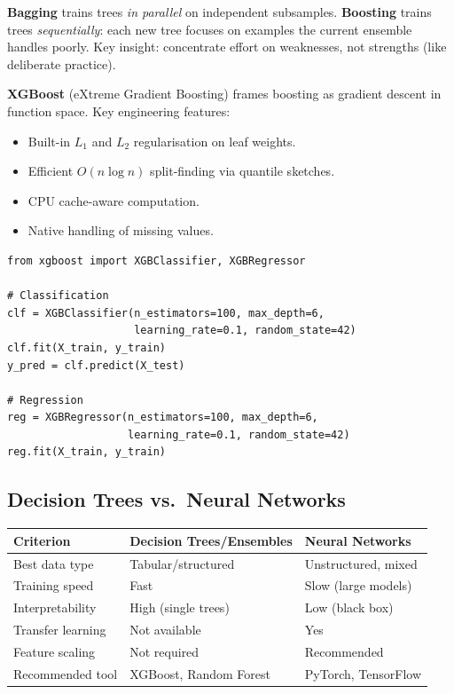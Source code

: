 \textbf{Bagging} trains trees \emph{in parallel} on independent subsamples.
\textbf{Boosting} trains trees \emph{sequentially}: each new tree focuses on
examples the current ensemble handles poorly. Key insight: concentrate effort
on weaknesses, not strengths (like deliberate practice).

\textbf{XGBoost} (eXtreme Gradient Boosting) frames boosting as gradient
descent in function space. Key engineering features:
\begin{itemize}
\item Built-in $L_1$ and $L_2$ regularisation on leaf weights.
\item Efficient $O(n\log n)$ split-finding via quantile sketches.
\item CPU cache-aware computation.
\item Native handling of missing values.
\end{itemize}

\begin{lstlisting}[caption={XGBoost for classification and regression}]
from xgboost import XGBClassifier, XGBRegressor

# Classification
clf = XGBClassifier(n_estimators=100, max_depth=6,
                    learning_rate=0.1, random_state=42)
clf.fit(X_train, y_train)
y_pred = clf.predict(X_test)

# Regression
reg = XGBRegressor(n_estimators=100, max_depth=6,
                   learning_rate=0.1, random_state=42)
reg.fit(X_train, y_train)
\end{lstlisting}

\subsection{Decision Trees vs.\ Neural Networks}

\begin{center}
\begin{tabular}{lp{5cm}p{5cm}}
\toprule
\textbf{Criterion} & \textbf{Decision Trees/Ensembles} & \textbf{Neural Networks}\\
\midrule
Best data type    & Tabular/structured         & Unstructured, mixed\\
Training speed    & Fast                        & Slow (large models)\\
Interpretability  & High (single trees)         & Low (black box)\\
Transfer learning & Not available               & Yes\\
Feature scaling   & Not required               & Recommended\\
Recommended tool  & XGBoost, Random Forest     & PyTorch, TensorFlow\\
\bottomrule
\end{tabular}
\end{center}

